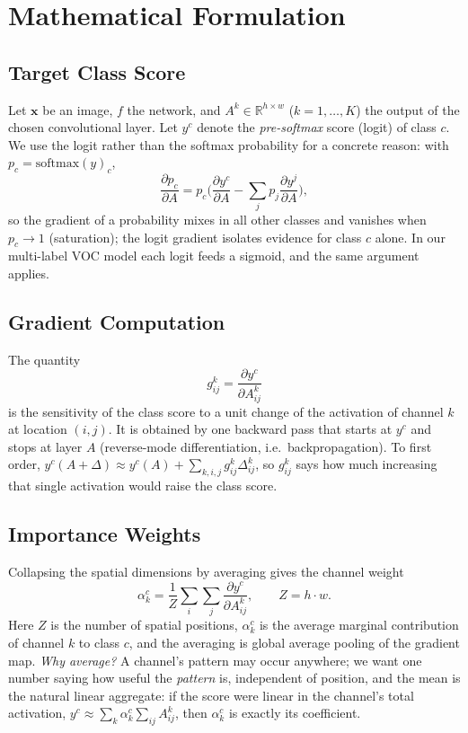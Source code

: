 \documentclass[11pt,a4paper]{article}
\begin{document}
\section{Mathematical Formulation}\label{sec:math}
\subsection{Target Class Score}
Let $\bm{x}$ be an image, $f$ the network, and $A^k\in\mathbb{R}^{h\times w}$ ($k=1,\dots,K$) the output of the chosen convolutional layer. Let $y^c$ denote the \emph{pre-softmax} score (logit) of class $c$. We use the logit rather than the softmax probability for a concrete reason: with $p_c=\mathrm{softmax}(y)_c$,
\begin{equation}
\frac{\partial p_c}{\partial A} = p_c\Big(\frac{\partial y^c}{\partial A}-\sum_j p_j \frac{\partial y^j}{\partial A}\Big),
\label{eq:softmax-grad}
\end{equation}
so the gradient of a probability mixes in all other classes and vanishes when $p_c\to1$ (saturation); the logit gradient isolates evidence for class $c$ alone. In our multi-label VOC model each logit feeds a sigmoid, and the same argument applies.

\subsection{Gradient Computation}
The quantity
\begin{equation}
g^{k}_{ij}=\frac{\partial y^c}{\partial A^k_{ij}}
\label{eq:grad}
\end{equation}
is the sensitivity of the class score to a unit change of the activation of channel $k$ at location $(i,j)$. It is obtained by one backward pass that starts at $y^c$ and stops at layer $A$ (reverse-mode differentiation, i.e.\ backpropagation). To first order, $y^c(A+\Delta)\approx y^c(A)+\sum_{k,i,j} g^{k}_{ij}\Delta^k_{ij}$, so $g^k_{ij}$ says how much increasing that single activation would raise the class score.

\subsection{Importance Weights}
Collapsing the spatial dimensions by averaging gives the channel weight
\begin{equation}
\alpha_k^c=\frac{1}{Z}\sum_{i}\sum_{j}\frac{\partial y^c}{\partial A^k_{ij}},\qquad Z=h\cdot w .
\label{eq:alpha}
\end{equation}
Here $Z$ is the number of spatial positions, $\alpha^c_k$ is the average marginal contribution of channel $k$ to class $c$, and the averaging is global average pooling of the gradient map. \emph{Why average?} A channel's pattern may occur anywhere; we want one number saying how useful the \emph{pattern} is, independent of position, and the mean is the natural linear aggregate: if the score were linear in the channel's total activation, $y^c\approx \sum_k \alpha_k^c \sum_{ij}A^k_{ij}$, then $\alpha_k^c$ is exactly its coefficient.
\end{document}
